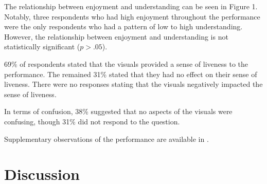 The relationship between enjoyment and understanding can be seen in Figure 1. Notably, three respondents who had high enjoyment throughout the performance were the only respondents who had a pattern of low to high understanding. However, the relationship between enjoyment and understanding is not statistically significant ($p > .05$).

69\% of respondents stated that the visuals provided a sense of liveness to the performance. The remained 31\% stated that they had no effect on their sense of liveness. There were no responses stating that the visuals negatively impacted the sense of liveness. 

In terms of confusion, 38\% suggested that no aspects of the visuals were confusing, though 31\% did not respond to the question.

Supplementary observations of the performance are available in .

\section{Discussion}







